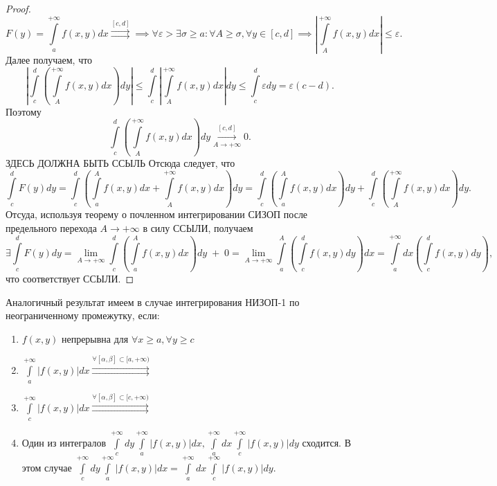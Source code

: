 \documentclass[../../main.tex]{subfiles}
\begin{document}
\begin{proof}
	$$F(y) = \int\limits_a^{+\infty} f(x, y)dx \overset{[c, d]}\rightrightarrows \implies
	\forall \varepsilon > \exists \sigma \geq a: \forall A \geq \sigma, \forall y \in [c, d] \implies \left|\int\limits_A^{+\infty}f(x, y) dx \right| \leq \varepsilon.$$ 
	Далее получаем, что 
	$$ \left| \int\limits_c^d\left(\int\limits_A^{+\infty}f(x, y)dx\right) dy\right| 
	\leq \int\limits_c^d\left|\int\limits_A^{+\infty}f(x, y)dx\right| dy
	\leq \int\limits_c^d \varepsilon dy = \varepsilon(c - d).$$
	Поэтому 
	$$
	\int\limits_c^d \left( \int\limits_A^{+\infty} f(x, y) dx \right) dy \overset{[c, d]}{\underset{A \rightarrow +\infty}\longrightarrow} 0.$$ ЗДЕСЬ ДОЛЖНА БЫТЬ ССЫЛЬ
	Отсюда следует, что
	$$
	\int\limits_c^d F(y)dy = \int\limits_c^d \left( \int\limits_a^A f(x, y)dx + \int\limits_A^{+\infty} f(x, y) dx \right) dy = \int\limits_c^d \left( \int\limits_a^A f(x, y) dx \right) dy + \int\limits_c^d \left( \int\limits_A^{+\infty} f(x, y) dx \right) dy.
	$$
	Отсуда, используя теорему о почленном интегрировании СИЗОП после предельного перехода $A \longrightarrow +\infty$ в силу ССЫЛИ, получаем 
	$$
	\exists \int\limits_c^d F(y) dy = \lim_{A \rightarrow +\infty} \int\limits_c^d \left( \int\limits_a^A f(x, y) dx \right) dy \; + \; 0 
	= \lim_{A \rightarrow +\infty} \int\limits_a^A \left( \int\limits_c^d f(x, y) dy \right) dx 
	= \int\limits_a^{+\infty} dx \left( \int\limits_c^d f(x, y) dy \right),
	$$ что соответствует ССЫЛИ.
\end{proof}

\begin{rem}
	Аналогичный результат имеем в случае интегрирования НИЗОП-1 по неограниченному промежутку, если:
	\begin{enumerate}
		\item $\displaystyle f(x, y)$ непрерывна для $\forall x \geq a, \forall y \geq c$
		\item $\displaystyle \int\limits_a^{+\infty} \left| f(x, y) \right| dx \overset{\forall [\alpha, \beta] \subset [a, +\infty) }\rightrightarrows$
		\item $\displaystyle \int\limits_c^{+\infty} \left| f(x, y) \right| dx \overset{\forall [\alpha, \beta] \subset [c, +\infty) }\rightrightarrows$
		\item Один из интегралов $\displaystyle \int\limits_c^{+\infty} dy \int\limits_a^{+\infty} \left|f(x, y)\right| dx,
		\int\limits_a^{+\infty} dx \int\limits_c^{+\infty} \left|f(x, y)\right| dy$
		сходится. В этом случае
		$\displaystyle \int\limits_c^{+\infty} dy \int\limits_a^{+\infty} \left|f(x, y)\right| dx = \int\limits_a^{+\infty} dx \int\limits_c^{+\infty} \left|f(x, y)\right| dy$.
	\end{enumerate}
\end{rem}
\end{document}
